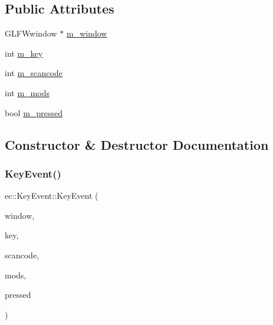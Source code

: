 \subsection*{Public Attributes}
\begin{DoxyCompactItemize}
\item 
G\+L\+F\+Wwindow $\ast$ \mbox{\hyperlink{structec_1_1_key_event_a334f32a8102f1d155a6fec87375efd04}{m\+\_\+window}}
\item 
int \mbox{\hyperlink{structec_1_1_key_event_a1c81390df89a4894405bee6cb101649e}{m\+\_\+key}}
\item 
int \mbox{\hyperlink{structec_1_1_key_event_ac7d1cc5ce7aad43f0aa73879677ad375}{m\+\_\+scancode}}
\item 
int \mbox{\hyperlink{structec_1_1_key_event_a2b57c4779afbd78542be4cee2cd3dcbb}{m\+\_\+mods}}
\item 
bool \mbox{\hyperlink{structec_1_1_key_event_a4e9ab83e1535c1ee34c9eb54c21b05e3}{m\+\_\+pressed}}
\end{DoxyCompactItemize}


\subsection{Constructor \& Destructor Documentation}
\mbox{\label{structec_1_1_key_event_a679ba7a0050b6514a3a6a110b4128562}} 
\subsubsection{\texorpdfstring{Key\+Event()}{KeyEvent()}}
{\footnotesize\ttfamily ec\+::\+Key\+Event\+::\+Key\+Event (\begin{DoxyParamCaption}\item[{G\+L\+F\+Wwindow $\ast$}]{window,  }\item[{const int}]{key,  }\item[{const int}]{scancode,  }\item[{const int}]{mods,  }\item[{const bool}]{pressed }\end{DoxyParamCaption})}

\mbox{\label{structec_1_1_key_event_a2e9713c01afb046dc2504f17ce42e386}} 
